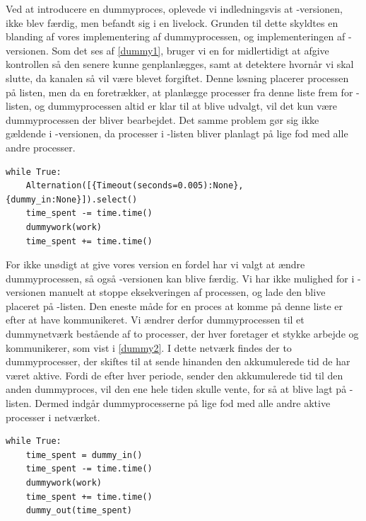 Ved at introducere en dummyproces, oplevede vi indledningsvis at -versionen, ikke blev færdig, men befandt sig i en  livelock. Grunden til dette skyldtes  en blanding af vores implementering af dummyprocessen, og implementeringen af -versionen. Som det ses af \cref{dummy1}, bruger vi en  for midlertidigt at afgive kontrollen så den senere kunne genplanlægges, samt at detektere hvornår vi skal slutte, da kanalen så vil være blevet forgiftet.
Denne løsning placerer processen på listen, men da \sched en foretrækker, at planlægge processer fra denne liste frem for -listen, og dummyprocessen altid er klar til at blive udvalgt, vil det kun være dummyprocessen der bliver bearbejdet. Det samme problem gør sig ikke gældende i -versionen, da processer i -listen bliver planlagt på lige fod med alle andre processer.

\begin{lstlisting}[firstnumber=1,float=hbtp, label=dummy1, caption=Uddrag af Dummyproces]
while True:
    Alternation([{Timeout(seconds=0.005):None}, {dummy_in:None}]).select()
    time_spent -= time.time()
    dummywork(work)
    time_spent += time.time()          
\end{lstlisting}

For ikke unødigt at give vores version en fordel har vi valgt at ændre dummyprocessen, så også -versionen kan blive færdig. Vi har ikke mulighed for i -versionen manuelt at stoppe eksekveringen af processen, og lade den  blive placeret på -listen. Den eneste måde for en proces at komme på denne liste er efter at have kommunikeret. Vi ændrer derfor dummyprocessen til et dummynetværk bestående af to processer, der hver foretager et stykke arbejde og kommunikerer, som vist i \cref{dummy2}. I dette netværk findes der to dummyprocesser, der skiftes til at sende hinanden den akkumulerede tid de har været aktive. Fordi de efter hver periode, sender den akkumulerede tid til den anden dummyproces, vil den ene hele tiden skulle vente, for så at blive lagt på -listen. Dermed  indgår dummyprocesserne  på lige fod med alle andre aktive processer i netværket.

\begin{lstlisting}[firstnumber=1 ,float=hbtp, label=dummy2, caption=Uddrag Dummynetværk]
while True:
    time_spent = dummy_in()
    time_spent -= time.time()
    dummywork(work)
    time_spent += time.time()
    dummy_out(time_spent)  
\end{lstlisting}



